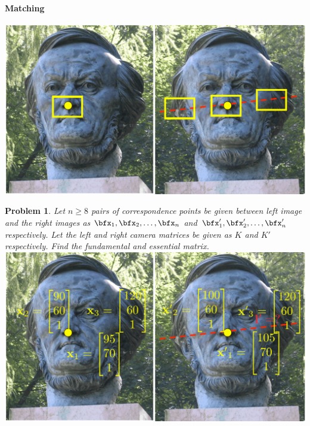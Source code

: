 \documentclass[times,singlecolumn]{article}
\newtheorem{prob}{Problem}
\begin{document}
\paragraph{Matching}
\includegraphics[width=0.5\linewidth]{media/stereo-images-matching.pdf}
\vspace{10em}

\begin{prob}
  Let $n \ge 8$ pairs of correspondence points be given between left image and
  the right images as $\bfx_1, \bfx_2, \dots, \bfx_n$ and $\bfx'_1, \bfx'_2,
  \dots, \bfx'_n$ respectively. Let the left and right camera matrices be given
  as $K$ and $K'$ respectively. Find the fundamental and essential matrix.
  \\
  \includegraphics[width=0.5\linewidth]{media/stereo-images-correspond.pdf}
\end{prob}
\end{document}
